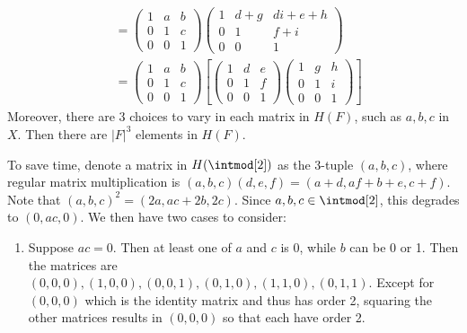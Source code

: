 \begin{problems}
\begin{solalph}
\begin{align*}
            & = 
            \begin{pmatrix}
                1 & a & b \\
                0 & 1 & c \\
                0 & 0 & 1
            \end{pmatrix}
            \begin{pmatrix}
                1 & d + g & di + e + h \\
                0 & 1 & f + i \\
                0 & 0 & 1
            \end{pmatrix} \\
            & = 
            \begin{pmatrix}
                1 & a & b \\
                0 & 1 & c \\
                0 & 0 & 1
            \end{pmatrix}
            \left[\begin{pmatrix}
                1 & d & e \\
                0 & 1 & f \\
                0 & 0 & 1
            \end{pmatrix}
            \begin{pmatrix}
                1 & g & h \\
                0 & 1 & i \\
                0 & 0 & 1
            \end{pmatrix}\right]
        \end{align*}
        Moreover, there are 3 choices to vary in each matrix in $H(F)$, such as $a, b, c$ in $X$. Then there are $|F|^3$ elements in $H(F)$.
        \item To save time, denote a matrix in $H(\intmod[2])$ as the 3-tuple $(a, b, c)$, where regular matrix multiplication is $(a, b, c)(d, e, f) = (a + d, af + b + e,  c + f)$. Note that $(a, b, c)^2 = (2a, ac + 2b, 2c)$. Since $a, b, c \in \intmod[2]$, this degrades to $(0, ac, 0)$. We then have two cases to consider: 
        \begin{enumerate}
            \item Suppose $ac = 0$. Then at least one of $a$ and $c$ is 0, while $b$ can be $0$ or 1. Then the matrices are $(0, 0, 0), (1, 0, 0), (0, 0, 1), (0, 1, 0), (1, 1, 0), (0, 1, 1)$. Except for $(0, 0, 0)$ which is the identity matrix and thus has order 2, squaring the other matrices results in $(0, 0, 0)$ so that each have order 2.

\end{enumerate}
\end{solalph}
\end{problems}
